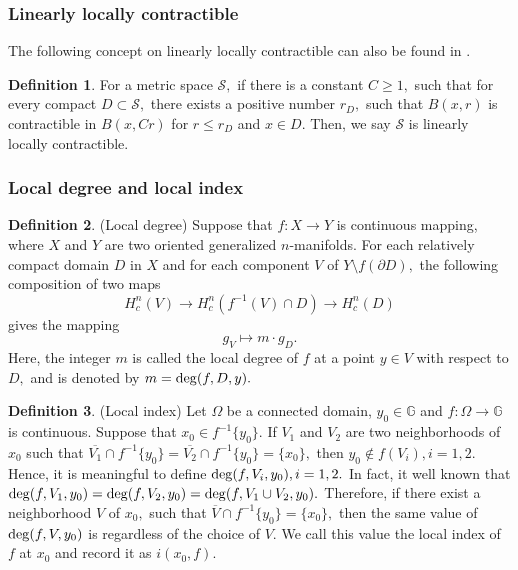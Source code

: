 \documentclass[11pt,twoside]{article}
\theoremstyle{definition}
\newtheorem{defn}{Definition}[section]
\theoremstyle{remark}
\begin{document}
 \subsubsection{Linearly locally contractible}
The following concept on linearly locally contractible can also be found in \cite{HK11,HR02,HS02}.
\begin{defn}
For a metric space $\mathcal{S},$ if there is a constant $C\geq1,$ such that for every compact $D\subset\mathcal{S},$ there exists a positive number $r_{D},$ such that $B(x,r)$ is contractible 
in $B(x,Cr)$ for $r\leq r_{D}$ and $x\in D.$ Then, we say $\mathcal{S}$ is linearly locally contractible.
\end{defn}
 
 \subsubsection{Local degree and local index}
\begin{defn}\cite{HS02}(Local degree)
Suppose that $f: X\rightarrow Y$ is continuous mapping, where $X$ and $Y$ are two oriented generalized $n$-manifolds. For each relatively compact domain $D$ in $X$  and for each component $V$ of 
$Y\setminus f(\partial D),$ the following composition of two maps
$$H_{c}^{n}(V)\rightarrow H_{c}^{n}(f^{-1}(V)\cap D)\rightarrow H_{c}^{n}(D)$$
gives the mapping 
$$g_{V}\mapsto m\cdot g_{D}.$$ 
 Here, the integer $m$ is called the local degree of $f$ at a point $y\in V$ with respect to $D,$ and is denoted by $m={\rm deg}(f,D,y).$ 
\end{defn}


\begin{defn}\cite{KO222}(Local index)
 Let $\Omega$ be a connected domain, $y_{0}\in\mathbb{G}$ and   $f:\Omega\rightarrow\mathbb{G}$ is continuous. Suppose that $x_{0}\in f^{-1}\{y_{0}\}.$ If $V_{1}$ and $V_{2}$ are two neighborhoods of $x_{0}$ such that $\overline{V_{1}}\cap f^{-1}\{y_{0}\}=\overline{V_{2}}\cap f^{-1}\{y_{0}\}=\{x_{0}\},$ then $y_{0}\notin f(V_{i}), i=1,2.$ Hence, it is meaningful to define  ${\rm deg}(f,V_{i},y_{0}),i=1,2.$ In fact, it well known that ${\rm deg}(f,V_{1},y_{0})={\rm deg}(f,V_{2},y_{0})={\rm deg}(f,V_{1}\cup V_{2},y_{0}).$ Therefore, if there exist a neighborhood $V$ of $x_{0},$ such that 
$\overline{V}\cap f^{-1}\{y_{0}\}=\{x_{0}\},$ then the same value of ${\rm deg}(f,V,y_{0})$ is regardless of the choice of $V.$ We call this value the local index of $f$ at $x_{0}$ and  record it as $i(x_{0},f).$
\end{defn}
\end{document}
